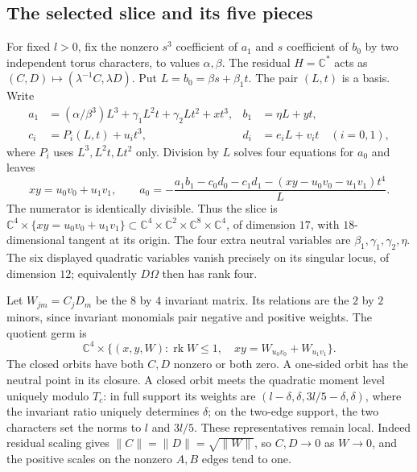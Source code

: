 \documentclass[11pt]{amsart}
\theoremstyle{definition}
\theoremstyle{remark}
\newcommand{\CC}{\mathbb C}
\newcommand{\rk}{\operatorname{rk}}
\begin{document}
\subsection{The selected slice and its five pieces}\label{subsec:five-pieces}
For fixed $l>0$, fix the nonzero $s^3$ coefficient of $a_1$ and
$s$ coefficient of $b_0$ by two independent torus characters, to values
$\alpha,\beta$. The residual $H=\CC^*$ acts as
$(C,D)\mapsto(\lambda^{-1}C,\lambda D)$. Put $L=b_0=\beta s+\beta_1t$.
The pair $(L,t)$ is a basis. Write
\begin{align*}
 a_1&=(\alpha/\beta^3)L^3+\gamma_1L^2t+\gamma_2Lt^2+x t^3,
 &b_1&=\eta L+y t,\\
 c_i&=P_i(L,t)+u_it^3,&d_i&=e_iL+v_it\quad(i=0,1),
\end{align*}
where $P_i$ uses $L^3,L^2t,Lt^2$ only.
Division by $L$ solves four equations for $a_0$ and leaves
\begin{equation}\label{eq:selected-quadric}
 xy=u_0v_0+u_1v_1,\qquad
 a_0=-\frac{a_1b_1-c_0d_0-c_1d_1-(xy-u_0v_0-u_1v_1)t^4}{L}.
\end{equation}
The numerator is identically divisible. Thus the slice is
$\CC^4\times\{xy=u_0v_0+u_1v_1\}\subset
\CC^4\times\CC^2\times\CC^8\times\CC^4$,
of dimension $17$, with $18$-dimensional tangent at its origin.
The four extra neutral variables are $\beta_1,\gamma_1,\gamma_2,\eta$.
The six displayed quadratic variables vanish precisely on its singular
locus, of dimension $12$; equivalently $D\Omega$ then has rank four.

Let $W_{jm}=C_jD_m$ be the $8$ by $4$ invariant matrix. Its relations
are the $2$ by $2$ minors, since invariant monomials pair negative and
positive weights. The quotient germ is
\begin{equation}\label{eq:selected-quotient}
 \CC^4\times\{(x,y,W):\rk W\le1,\quad
 xy=W_{u_0v_0}+W_{u_1v_1}\}.
\end{equation}
The closed orbits have both $C,D$ nonzero or both zero. A one-sided
orbit has the neutral point in its closure. A closed orbit meets the
quadratic moment level uniquely modulo $T_c$: in full support its weights
are $(l-\delta,\delta,3l/5-\delta,\delta)$, where the invariant ratio
uniquely determines $\delta$; on the two-edge support, the two characters
set the norms to $l$ and $3l/5$. These representatives remain local.
Indeed residual scaling gives $\|C\|=\|D\|=\sqrt{\|W\|}$,
so $C,D\to0$ as $W\to0$, and the positive scales on the nonzero
$A,B$ edges tend to one.
\end{document}
